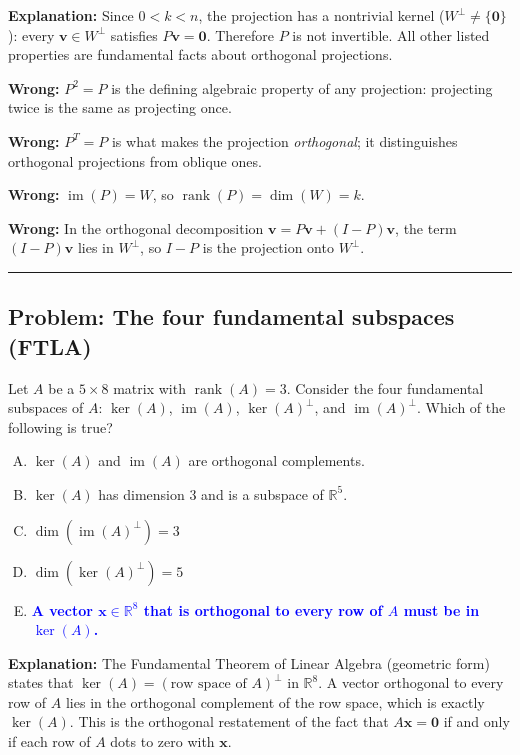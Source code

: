 \documentclass[12pt]{amsart}
\newcommand{\divider}{
  \vspace{-1em}
  \noindent
  \raisebox{-0.15ex}{\textbullet}%
  \hspace{0.5em}%
  \rule[0.5ex]{0.95\textwidth}{1.0pt}%
  \hspace{0.5em}%
  \raisebox{-0.15ex}{\textbullet}%
  \vspace{0em}
}
\begin{document}
\textbf{Explanation:}
Since $0 < k < n$, the projection has a nontrivial kernel ($W^\perp \neq \{\mathbf{0}\}$):
every $\mathbf{v} \in W^\perp$ satisfies $P\mathbf{v} = \mathbf{0}$.
Therefore $P$ is not invertible.
All other listed properties are fundamental facts about orthogonal projections.

\textbf{Wrong:}
$P^2 = P$ is the defining algebraic property of any projection: projecting twice
is the same as projecting once.

\textbf{Wrong:}
$P^T = P$ is what makes the projection \emph{orthogonal}; it distinguishes
orthogonal projections from oblique ones.

\textbf{Wrong:}
$\operatorname{im}(P) = W$, so $\operatorname{rank}(P) = \dim(W) = k$.

\textbf{Wrong:}
In the orthogonal decomposition $\mathbf{v} = P\mathbf{v} + (I-P)\mathbf{v}$, the term
$(I-P)\mathbf{v}$ lies in $W^\perp$, so $I-P$ is the projection onto $W^\perp$.

\divider

\subsection*{Problem: The four fundamental subspaces (FTLA)}

Let $A$ be a $5\times 8$ matrix with $\operatorname{rank}(A) = 3$.
Consider the four fundamental subspaces of $A$:
$\ker(A)$, $\operatorname{im}(A)$, $\ker(A)^\perp$, and $\operatorname{im}(A)^\perp$.
Which of the following is true?

\begin{enumerate}[(A)]
\item $\ker(A)$ and $\operatorname{im}(A)$ are orthogonal complements.
\item $\ker(A)$ has dimension $3$ and is a subspace of $\mathbb{R}^5$.
\item $\dim(\operatorname{im}(A)^\perp) = 3$
\item $\dim(\ker(A)^\perp) = 5$
\item \textcolor{blue}{\textbf{A vector $\mathbf{x} \in \mathbb{R}^8$ that is orthogonal to every row of $A$ must be in $\ker(A)$.}}
\end{enumerate}

\textbf{Explanation:}
The Fundamental Theorem of Linear Algebra (geometric form) states that
$\ker(A) = (\text{row space of }A)^\perp$ in $\mathbb{R}^8$.
A vector orthogonal to every row of $A$ lies in the orthogonal complement of
the row space, which is exactly $\ker(A)$.
This is the orthogonal restatement of the fact that $A\mathbf{x} = \mathbf{0}$ if and
only if each row of $A$ dots to zero with $\mathbf{x}$.
\end{document}
